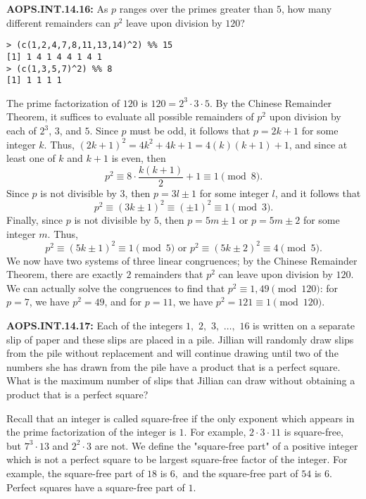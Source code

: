 \documentclass[11pt]{article}
\newenvironment{uzdevums}[1][\unskip]{%
\vspace{3mm}
\noindent
\textbf{#1:}
\noindent}
{}
\begin{document}
\begin{uzdevums}[AOPS.INT.14.16]
As $p$ ranges over the primes greater than $5$, how many different remainders can $p^2$ leave upon division by $120$?
\end{uzdevums}

\begin{verbatim}
> (c(1,2,4,7,8,11,13,14)^2) %% 15
[1] 1 4 1 4 4 1 4 1
> (c(1,3,5,7)^2) %% 8
[1] 1 1 1 1
\end{verbatim}

The prime factorization of $120$ is $120 = 2^3 \cdot 3 \cdot 5$. By the Chinese Remainder Theorem, it suffices to evaluate all possible remainders of $p^2$ upon division by each of $2^3$, $3$, and $5$. Since $p$ must be odd, it follows that $p = 2k+1$ for some integer $k$. Thus, $(2k+1)^2 = 4k^2 + 4k + 1 = 4(k)(k+1) + 1$, and since at least one of $k$ and $k+1$ is even, then $$p^2 \equiv 8 \cdot \frac{k(k+1)}{2} + 1 \equiv 1 \pmod{8}.$$Since $p$ is not divisible by $3$, then $p = 3l \pm 1$ for some integer $l$, and it follows that $$p^2 \equiv (3k \pm 1)^2 \equiv (\pm 1)^2 \equiv 1 \pmod{3}.$$Finally, since $p$ is not divisible by $5$, then $p = 5m \pm 1$ or $p = 5m \pm 2$ for some integer $m$. Thus, $$p^2 \equiv (5k \pm 1)^2 \equiv 1 \pmod{5} \text{ or } p^2 \equiv (5k \pm 2)^2 \equiv 4 \pmod{5}.$$We now have two systems of three linear congruences; by the Chinese Remainder Theorem, there are exactly $\boxed{2}$ remainders that $p^2$ can leave upon division by $120$. We can actually solve the congruences to find that $p^2 \equiv 1, 49 \pmod{120}$: for $p = 7$, we have $p^2 = 49$, and for $p = 11$, we have $p^2 = 121 \equiv 1 \pmod{120}$.


\begin{uzdevums}[AOPS.INT.14.17]
Each of the integers $1,$ $2,$ $3,$ $\dots,$ $16$ is written on a separate slip of paper and these slips are placed in a pile. Jillian will randomly draw slips from the pile without replacement and will continue drawing until two of the numbers she has drawn from the pile have a product that is a perfect square. What is the maximum number of slips that Jillian can draw without obtaining a product that is a perfect square?
\end{uzdevums}

Recall that an integer is called square-free if the only exponent which appears in the prime factorization of the integer is $1.$ For example, $2\cdot3\cdot11$ is square-free, but $7^3\cdot13$ and $2^2\cdot3$ are not. We define the "square-free part" of a positive integer which is not a perfect square to be largest square-free factor of the integer. For example, the square-free part of $18$ is $6,$ and the square-free part of $54$ is $6.$ Perfect squares have a square-free part of $1.$
\end{document}
